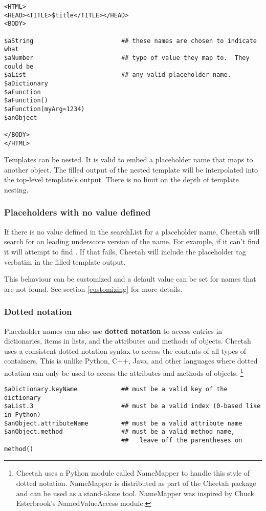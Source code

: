 \begin{verbatim}
<HTML>
<HEAD><TITLE>$title</TITLE></HEAD>
<BODY>

$aString                        ## these names are chosen to indicate what
$aNumber                        ## type of value they map to.  They could be
$aList                          ## any valid placeholder name.
$aDictionary
$aFunction
$aFunction()
$aFunction(myArg=1234)
$anObject

</BODY>
</HTML>
\end{verbatim}

Templates can be nested. It is valid to embed a placeholder name that maps to
another  object.  The filled output of the nested template will be
interpolated into the top-level template's output.  There is no limit on the
depth of template nesting.

\subsubsection{Placeholders with no value defined}
If there is no value defined in the searchList for a placeholder name,
Cheetah will search for an leading underscore version of the name.  For
example, if it can't find  it will attempt to find
.  If that fails, Cheetah will include the placeholder
tag verbatim in the filled template output.

This behaviour can be customized and a default value can be set for names
that are not found. See section \ref{customizing} for more details.

\subsubsection{Dotted notation}
Placeholder names can also use {\bf dotted notation} to access entries in
dictionaries, items in lists, and the attributes and methods of objects.
Cheetah uses a consistent dotted notation syntax to access the contents
of all types of containers.  This is unlike Python, C++, Java, and other
languages where dotted notation can only be used to access the attributes and
methods of objects. \footnote{Cheetah uses a Python module called
  NameMapper to handle this style of dotted notation.  NameMapper is distributed
  as part of the Cheetah package and can be used as a stand-alone tool.
  NameMapper was inspired by Chuck Esterbrook's NamedValueAccess module.}

\begin{verbatim}
$aDictionary.keyName            ## must be a valid key of the dictionary 
$aList.3                        ## must be a valid index (0-based like in Python)
$anObject.attributeName         ## must be a valid attribute name
$anObject.method                ## must be a valid method name, 
                                ##   leave off the parentheses on method()
\end{verbatim}


